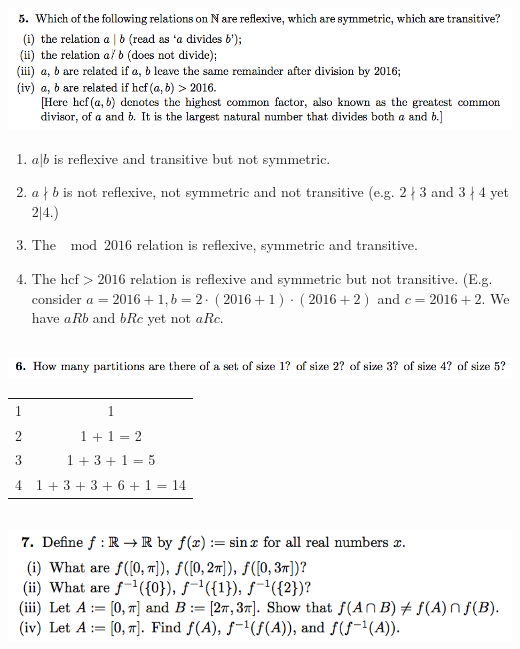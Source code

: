 \documentclass[12pt]{article}
\begin{document}
\subsection*{} %
\includegraphics[width=400pt]{img/iulm-1-5.png}
\begin{mdframed}
  \begin{enumerate}[label=(\roman*)]
  \item $a | b$ is reflexive and transitive but not symmetric.
  \item $a \nmid b$ is not reflexive, not symmetric and not transitive (e.g.
    $2 \nmid 3$ and $3 \nmid 4$ yet $2 | 4$.)
  \item The $\mod 2016$ relation is reflexive, symmetric and transitive.
  \item The $\text{hcf} > 2016$ relation is reflexive and symmetric but not
    transitive. (E.g. consider $a = 2016+1, b = 2\cdot(2016+1)\cdot(2016+2)$
    and $c = 2016+2$. We have $a R b$ and $b R c$ yet not $a R c$.
  \end{enumerate}
\end{mdframed}

\newpage
\subsection*{} %
\includegraphics[width=400pt]{img/iulm-1-6.png}
\begin{mdframed}
  \begin{tabular}{c|c}
    1 & 1\\
    2 & 1 + 1 = 2 \\
    3 & 1 + 3 + 1 = 5 \\
    4 & 1 + 3 + 3 + 6 + 1 = 14
  \end{tabular}
\end{mdframed}

\newpage
\subsection*{} %
\includegraphics[width=400pt]{img/iulm-1-7.png}
\begin{mdframed}
\end{mdframed}
\end{document}
